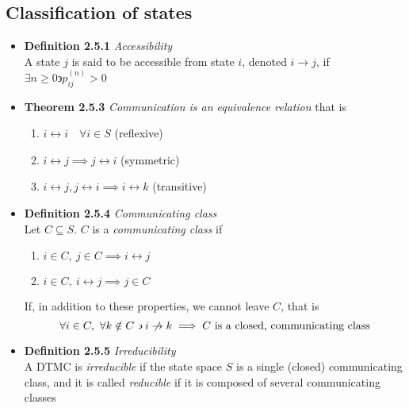\documentclass[11pt,a4paper]{article}
\begin{document}
\subsection{Classification of states}
\begin{itemize}
	\item \textbf{Definition 2.5.1} \emph{Accessibility} \\
		A state $j$ is said to be accessible from state $i$, denoted $i \rightarrow j$, if $\exists n \geq 0 \backepsilon p_{ij}^{(n)} > 0$
	\item \textbf{Theorem 2.5.3} \emph{Communication is an equivalence relation}
		that is
		\begin{enumerate}
			\item $i \leftrightarrow i \quad \forall i \in S$ (reflexive)
			\item $i \leftrightarrow j \implies j \leftrightarrow i$ (symmetric)
			\item $i \leftrightarrow j, j \leftrightarrow i \implies i \leftrightarrow k$ (transitive)
		\end{enumerate}
	\item \textbf{Definition 2.5.4} \emph{Communicating class} \\
		Let $C \subseteq S$. $C$ is a \emph{communicating class} if
		\begin{enumerate}
			\item $i \in C,\ j \in C \implies i \leftrightarrow j$
			\item $i \in C,\ i \leftrightarrow j \implies j \in C$
		\end{enumerate}
		If, in addition to these properties, we cannot leave $C$, that is 
		$$\forall i \in C,\ \forall k \notin C \backepsilon i \centernot\rightarrow k \implies C \text{ is a closed, communicating class}$$
	\item \textbf{Definition 2.5.5} \emph{Irreducibility} \\
		A DTMC is \emph{irreducible} if the state space $S$ is a single (closed) communicating class, and it is called \emph{reducible} if it is composed of several communicating classes
\end{itemize}
\end{document}
